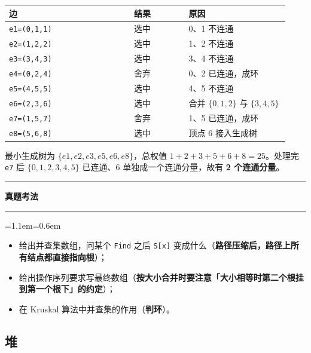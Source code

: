 \documentclass[11pt,openany,UTF8]{ctexbook}
\newcommand{\callouthead}[2]{%
  \par\addvspace{7pt}\noindent
  {\color{#1}\rule[-0.15em]{3pt}{1.05em}}\hspace{0.5em}%
  {\bfseries\color{#1}#2}\par\nobreak\vspace{-0.35em}%
  {\color{rulesep}\hrule height 0.4pt}\nobreak\vspace{0.45em}%
  \begingroup\small\setlength{\parindent}{0pt}%
  \leftskip=1.1em\rightskip=0.6em\noindent\ignorespaces}
\newcommand{\calloutend}{\par\endgroup\addvspace{7pt}}
\newenvironment{callexam}[1]{\callouthead{exambar}{#1}}{\calloutend}
\begin{document}
\begingroup\small\setlength{\tabcolsep}{4.0pt}
\begin{longtable}{@{}L{0.4110\linewidth}L{0.1827\linewidth}L{0.3349\linewidth}@{}}
\toprule
\textbf{边} & \textbf{结果} & \textbf{原因} \\
\midrule
\endhead
\texttt{e1=\allowbreak{}(0,\allowbreak{}1,\allowbreak{}1)\allowbreak{}} & 选中 & 0、1 不连通 \\
\texttt{e2=\allowbreak{}(1,\allowbreak{}2,\allowbreak{}2)\allowbreak{}} & 选中 & 1、2 不连通 \\
\texttt{e3=\allowbreak{}(3,\allowbreak{}4,\allowbreak{}3)\allowbreak{}} & 选中 & 3、4 不连通 \\
\texttt{e4=\allowbreak{}(0,\allowbreak{}2,\allowbreak{}4)\allowbreak{}} & 舍弃 & 0、2 已连通，成环 \\
\texttt{e5=\allowbreak{}(4,\allowbreak{}5,\allowbreak{}5)\allowbreak{}} & 选中 & 4、5 不连通 \\
\texttt{e6=\allowbreak{}(2,\allowbreak{}3,\allowbreak{}6)\allowbreak{}} & 选中 & 合并 $\{0,1,2\}$ 与 $\{3,4,5\}$ \\
\texttt{e7=\allowbreak{}(1,\allowbreak{}5,\allowbreak{}7)\allowbreak{}} & 舍弃 & 1、5 已连通，成环 \\
\texttt{e8=\allowbreak{}(5,\allowbreak{}6,\allowbreak{}8)\allowbreak{}} & 选中 & 顶点 6 接入生成树 \\
\bottomrule
\end{longtable}
\endgroup

最小生成树为 $\{e1,e2,e3,e5,e6,e8\}$，总权值 $1+2+3+5+6+8=25$。处理完 \texttt{e7} 后 $\{0,1,2,3,4,5\}$ 已连通、6 单独成一个连通分量，故有 \textbf{2 个连通分量}。

\begin{callexam}{真题考法}
\begin{itemize}
\item 给出并查集数组，问某个 \texttt{Find} 之后 \texttt{S[x]\allowbreak{}} 变成什么（\textbf{路径压缩后，路径上所有结点都直接指向根}）；
\item 给出操作序列要求写最终数组（\textbf{按大小合并时要注意「大小相等时第二个根挂到第一个根下」的约定}）；
\item 在 Kruskal 算法中并查集的作用（\textbf{判环}）。
\end{itemize}
\end{callexam}

\subsection{堆}
\end{document}
